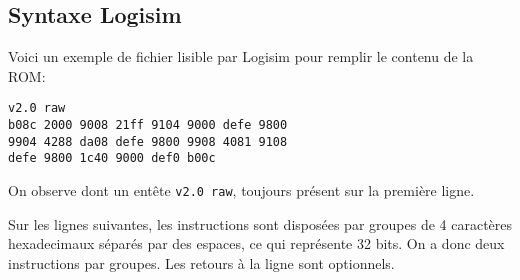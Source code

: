 \subsection{Syntaxe Logisim}

Voici un exemple de fichier lisible par Logisim pour remplir le contenu de la ROM:

\begin{lstlisting}
v2.0 raw
b08c 2000 9008 21ff 9104 9000 defe 9800
9904 4288 da08 defe 9800 9908 4081 9108
defe 9800 1c40 9000 def0 b00c
\end{lstlisting}

On observe dont un entête \texttt{v2.0 raw}, toujours présent sur la première ligne.

Sur les lignes suivantes, les instructions sont disposées par groupes de 4 caractères hexadecimaux séparés par des espaces, ce qui représente 32 bits. On a donc deux instructions par groupes. Les retours à la ligne sont optionnels.
